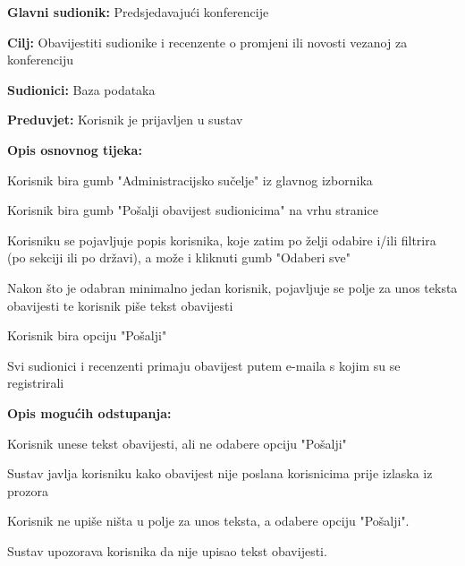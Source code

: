 				
					\noindent {}
					\begin{packed_item}
						\item \textbf{Glavni sudionik:} Predsjedavajući konferencije
						\item \textbf{Cilj:} Obavijestiti  sudionike i recenzente o promjeni ili novosti vezanoj za konferenciju
						\item \textbf{Sudionici:} Baza podataka
						\item \textbf{Preduvjet:} Korisnik je prijavljen u sustav
						
						\item \textbf{Opis osnovnog tijeka:} 
						\item[] \begin{packed_enum}
							\item Korisnik bira gumb "Administracijsko sučelje" iz glavnog izbornika
							\item Korisnik bira gumb "Pošalji obavijest sudionicima" na vrhu stranice
							\item Korisniku se pojavljuje popis korisnika, koje zatim po želji odabire i/ili filtrira (po sekciji ili po državi), a može i kliknuti gumb "Odaberi sve"
							\item Nakon što je odabran minimalno jedan korisnik, pojavljuje se polje za unos teksta obavijesti te korisnik piše tekst obavijesti
							\item Korisnik bira opciju "Pošalji"
							\item Svi sudionici i recenzenti primaju obavijest putem e-maila s kojim su se registrirali
						\end{packed_enum}
					
						\item \textbf{Opis mogućih odstupanja:}
						\item[] \begin{packed_enum}
							
		

							\item[5.a] Korisnik unese tekst obavijesti, ali ne odabere opciju "Pošalji"
							\item[] \begin{packed_enum}
								\item[1.] Sustav javlja korisniku kako obavijest nije poslana korisnicima prije izlaska iz prozora
							\end{packed_enum}
							\item[5.b] Korisnik ne upiše ništa u polje za unos teksta, a odabere opciju "Pošalji".
							\item[] \begin{packed_enum}
								\item[1.] Sustav upozorava korisnika da nije upisao tekst obavijesti.
							\end{packed_enum}
							
						\end{packed_enum}
					\end{packed_item}
				


